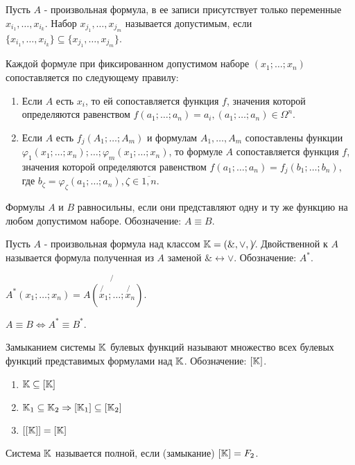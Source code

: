 \opr Пусть $A$ - произвольная формула, в ее записи присутствует только переменные $x_{i_1},\dots, x_{i_k}$. Набор $x_{j_1},\dots, x_{j_m}$ называется
допустимым, если $\{x_{i_1},\dots, x_{i_k}\} \subseteq \{x_{j_1},\dots, x_{j_m}\}$.

Каждой формуле при фиксированном допустимом наборе $(x_1; \dots; x_n)$ сопоставляется по следующему правилу:
\begin{enumerate}
    \item Если $A$ есть $x_i$, то ей сопоставляется функция $f$, значения которой определяются равенством $f(a_1;\dots;a_n) = a_i, (a_1;\dots;a_n) \in \Omega^n$.
    \item Если $A$ есть $f_j(A_1;\dots; A_m)$ и формулам $A_1, \dots, A_m$ сопоставлены функции $\varphi_1(x_1;\dots;x_n); \dots;\varphi_m(x_1;\dots;x_n)$, то формуле $A$ сопоставляется
функция $f$, значения которой определяются равенством $f(a_1;\dots;a_n) = f_j(b_1;\dots;b_n)$, где $b_\zeta = \varphi_\zeta(a_1;\dots;a_n), \zeta \in \overline{1, n}$.
\end{enumerate}

\opr Формулы $A$ и $B$ равносильны, если они представляют одну и ту же функцию на любом допустимом наборе. Обозначение: $A\equiv B$.

\opr Пусть $A$ - произвольная формула над классом $\mathbb{K} = ( \text{\&}, \vee, \not )$. Двойственной к $A$ называется формула полученная из $A$ заменой $\text{\&} \leftrightarrow \vee$. Обозначение: $A^*$.

\thr $A^*(x_1; \dots; x_n) = \not{A(\not{x_1}; \dots; \not{x_n})}$.

\sled $A \equiv B \Leftrightarrow A^* \equiv B^*$.

\opr Замыканием системы $\mathbb{K}$ булевых функций называют множество всех булевых функций представимых формулами над $\mathbb{K}$. Обозначение: $[\mathbb{K}]$.

\utv \begin{enumerate}
    \item $\mathbb{K} \subseteq [\mathbb{K}]$
    \item $\mathbb{K}_1 \subseteq \mathbb{K}_2 \Rightarrow [\mathbb{K}_1] \subseteq [\mathbb{K}_2]$
    \item $[[\mathbb{K}]] = [\mathbb{K}]$
\end{enumerate}

\opr Система $\mathbb{K}$ называется полной, если (замыкание) $[\mathbb{K}] = F_2$.